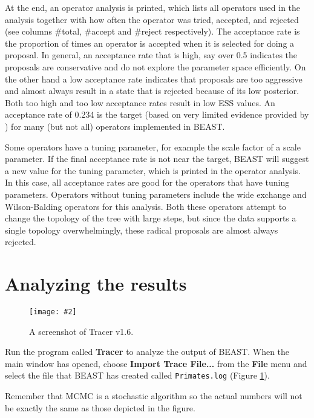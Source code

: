 \documentclass[11pt]{article}
\newcommand{\TracerVersion}{1.6}
\theoremstyle{plain}%
\theoremstyle{definition}
\theoremstyle{remark}
\newcommand{\includeimage}[2][]{%
\texttt{[image: \#2]}
}
\begin{document}
At the end, an operator analysis is printed, which lists all operators used in the
analysis together with how often the operator was tried, accepted, and rejected
(see columns \#total, \#accept and \#reject respectively). The acceptance rate is
the proportion of times an operator is accepted when it is selected for doing a
proposal. In general, an acceptance rate that is high, say over 0.5 indicates the
proposals are conservative and do not explore the parameter space efficiently. On
the other hand a low acceptance rate indicates that proposals are too aggressive
and almost always result in a state that is rejected because of its low posterior.
Both too high and too low acceptance rates result in low ESS values. 
An acceptance rate of 0.234 is the target (based on very limited evidence provided by \cite{gelman1996efficient}) for many (but not all) operators implemented in BEAST.

Some operators have a tuning parameter, for example the scale factor of a
scale parameter. If the final acceptance rate is not near the target, BEAST will
suggest a new value for the tuning parameter, which is printed in the operator analysis. In this case, all acceptance rates are good for the operators that have tuning parameters. Operators without tuning parameters include the wide
exchange and Wilson-Balding operators for this analysis. Both these operators
attempt to change the topology of the tree with large steps, but since the data
supports a single topology overwhelmingly, these radical proposals are almost
always rejected.

\section{Analyzing the results}

\begin{figure}
\centering	
\includeimage[width=0.9\textwidth]{figures/Tracer1}
\label{fig:Tracer1}
\caption{A screenshot of Tracer v{\TracerVersion}.}
\end{figure}

Run the program called {\bf Tracer} to analyze the output of BEAST. When the main
window has opened, choose {\bf Import Trace File...} from the {\bf File} menu and select the file that
BEAST has created called \texttt{Primates.log} (Figure \ref{fig:Tracer1}).

Remember that MCMC is a stochastic algorithm so the actual numbers will not be exactly the same as those depicted in the figure.
\end{document}
